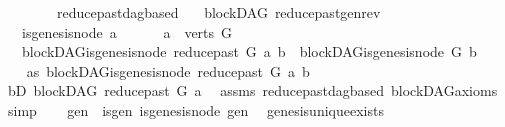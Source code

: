 \begin{isabellebody}
\ \ \ \ \ \ \ \ reduce{\isacharunderscore}{\kern0pt}past{\isacharunderscore}{\kern0pt}dagbased{\isacharparenright}{\kern0pt}\ \isanewline
{}\isamarkupfalse%
%
\endisatagproof
{\isafoldproof}%
%
\isadelimproof
\isanewline
%
\endisadelimproof
\isanewline
\isanewline
\isanewline
{}\isamarkupfalse%
\ {\isacharparenleft}{\kern0pt}\ blockDAG{\isacharparenright}{\kern0pt}\ reduce{\isacharunderscore}{\kern0pt}past{\isacharunderscore}{\kern0pt}gen{\isacharunderscore}{\kern0pt}rev{\isacharcolon}{\kern0pt}\isanewline
\ \ \ {\isachardoublequoteopen}{\isasymnot}is{\isacharunderscore}{\kern0pt}genesis{\isacharunderscore}{\kern0pt}node\ a{\isachardoublequoteclose}\ \isanewline
\ \ \ \ \ {\isachardoublequoteopen}a\ {\isasymin}\ verts\ G{\isachardoublequoteclose}\isanewline
\ \ \ {\isachardoublequoteopen}blockDAG{\isachardot}{\kern0pt}is{\isacharunderscore}{\kern0pt}genesis{\isacharunderscore}{\kern0pt}node\ {\isacharparenleft}{\kern0pt}reduce{\isacharunderscore}{\kern0pt}past\ G\ a{\isacharparenright}{\kern0pt}\ b\ {\isasymLongrightarrow}\ blockDAG{\isachardot}{\kern0pt}is{\isacharunderscore}{\kern0pt}genesis{\isacharunderscore}{\kern0pt}node\ G\ b{\isachardoublequoteclose}\isanewline
%
\isadelimproof
%
\endisadelimproof
%
\isatagproof
{}\isamarkupfalse%
\ {\isacharminus}{\kern0pt}\isanewline
\ \ \isamarkupfalse%
\ as{}{\isacharcolon}{\kern0pt}\ {\isachardoublequoteopen}blockDAG{\isachardot}{\kern0pt}is{\isacharunderscore}{\kern0pt}genesis{\isacharunderscore}{\kern0pt}node\ {\isacharparenleft}{\kern0pt}reduce{\isacharunderscore}{\kern0pt}past\ G\ a{\isacharparenright}{\kern0pt}\ b{\isachardoublequoteclose}\isanewline
\ \ \isamarkupfalse%
\ bD{\isacharcolon}{\kern0pt}\ {\isachardoublequoteopen}blockDAG\ {\isacharparenleft}{\kern0pt}reduce{\isacharunderscore}{\kern0pt}past\ G\ a{\isacharparenright}{\kern0pt}{\isachardoublequoteclose}\ \isamarkupfalse%
\ assms\ reduce{\isacharunderscore}{\kern0pt}past{\isacharunderscore}{\kern0pt}dagbased\ blockDAG{\isacharunderscore}{\kern0pt}axioms\ \isamarkupfalse%
\ simp\isanewline
\ \ \isamarkupfalse%
\ gen\ \ is{\isacharunderscore}{\kern0pt}gen{\isacharcolon}{\kern0pt}\ {\isachardoublequoteopen}is{\isacharunderscore}{\kern0pt}genesis{\isacharunderscore}{\kern0pt}node\ gen{\isachardoublequoteclose}\ \isamarkupfalse%
\ genesis{\isacharunderscore}{\kern0pt}unique{\isacharunderscore}{\kern0pt}exists\ \isamarkupfalse%

\end{isabellebody}
